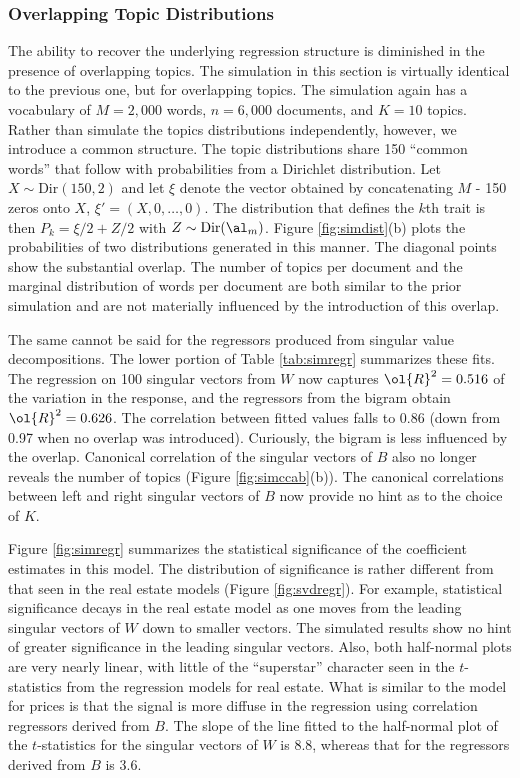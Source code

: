 \documentclass[12pt]{article}
\begin{document}
 
 \subsubsection{Overlapping Topic Distributions} %
 
 The ability to recover the underlying regression structure is diminished in the presence of overlapping topics.  The simulation in this section is virtually identical to the previous one, but for overlapping topics.  The simulation again has a vocabulary of $M=2,000$ words, $n=6,000$ documents, and $K=10$ topics.  Rather than simulate the topics distributions independently, however, we introduce a common structure.  The topic distributions share 150 ``common words'' that follow with probabilities from a Dirichlet distribution.  Let $X \sim \mbox{Dir}(150, 2)$ and let $\xi$ denote the vector obtained by concatenating $M$ - 150 zeros onto $X$, $\xi' = (X, 0 , \ldots, 0)$.  The distribution that defines the $k$th trait is then $P_k = \xi/2 + Z/2$ with $Z \sim \mbox{Dir}(\al_m)$.  Figure \ref{fig:simdist}(b) plots the probabilities of two distributions generated in this manner.  The diagonal points show the substantial overlap.  The number of topics per document and the marginal distribution of words per document are both similar to the prior simulation and are not materially influenced by the introduction of this overlap.
 
 
 The same cannot be said for the regressors produced from singular value decompositions.  The lower portion of Table \ref{tab:simregr} summarizes these fits.  The regression on 100 singular vectors from $W$ now captures $\ol{R}^2 = 0.516$ of the variation in the response, and the regressors from the bigram obtain $\ol{R}^2 = 0.626$.  The correlation between fitted values falls to 0.86 (down from 0.97 when no overlap was introduced).  Curiously, the bigram is less influenced by the overlap.  
 Canonical correlation of the singular vectors of $B$ also no longer reveals the number of topics (Figure \ref{fig:simccab}(b)).   The canonical correlations between left and right singular vectors of $B$ now provide no hint as to the choice of $K$.  
 
 
 Figure \ref{fig:simregr} summarizes the statistical significance of the coefficient estimates in this model.  The distribution of significance is rather different from that seen in the real estate models (Figure \ref{fig:svdregr}).  For example, statistical significance decays in the real estate model as one moves from the leading singular vectors of $W$ down to smaller vectors.  The simulated results show no hint of greater significance in the leading singular vectors.  
  Also, both half-normal plots are very nearly linear, with little of the ``superstar'' character seen in the $t$-statistics from the regression models for real estate.  What is similar to the model for prices is that the signal is more diffuse in the regression using correlation regressors derived from $B$.  The slope of the line fitted to the half-normal plot of the $t$-statistics for the singular vectors of $W$ is 8.8, whereas that for the regressors derived from $B$ is 3.6.  
 
\end{document}
